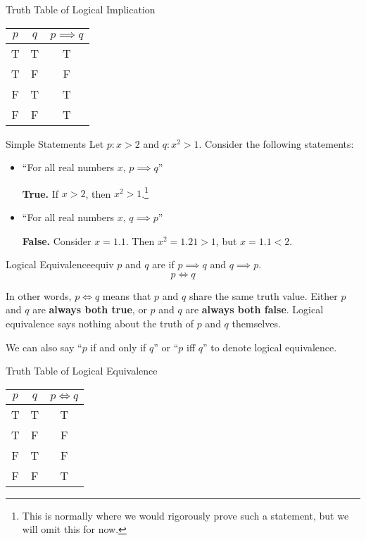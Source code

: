 \documentclass[12pt]{report}
\begin{document}
\begin{exbox}{Truth Table of Logical Implication}{}
    \begin{center}\begin{tabular}{c | c || c}
        $p$ & $q$ & $p \implies q$ \\ \hline
        T & T & T \\
        T & F & F \\
        F & T & T \\
        F & F & T
    \end{tabular}\end{center}
\end{exbox}

\begin{exbox}{Simple Statements}{}
    Let $p : x > 2$ and $q : x^2 > 1$. Consider the following statements:
    \begin{itemize}
        \item ``For all real numbers $x$, $p \implies q$''

        \textbf{True.} If $x > 2$, then $x^2 > 1$.\footnote{This is normally where we would rigorously prove such a statement, but we will omit this for now.}

        \item ``For all real numbers $x$, $q \implies p$''

        \textbf{False.} Consider $x = 1.1$. Then $x^2 = 1.21 > 1$, but $x = 1.1 < 2$.
    \end{itemize}
\end{exbox}

\begin{dfnbox}{Logical Equivalence}{equiv}
    $p$ and $q$ are  if $p \implies q$ and $q \implies p$.
    \tcblower
    \[ p \iff q \]
\end{dfnbox}

In other words, $p \iff q$ means that $p$ and $q$ share the same truth value. Either $p$ and $q$ are \textbf{always both true}, or $p$ and $q$ are \textbf{always both false}. Logical equivalence says nothing about the truth of $p$ and $q$ themselves.

We can also say ``$p$ if and only if $q$'' or ``$p$ iff $q$'' to denote logical equivalence.

\begin{exbox}{Truth Table of Logical Equivalence}{}
    \begin{center}\begin{tabular}{c | c || c}
        $p$ & $q$ & $p \iff q$ \\ \hline
        T & T & T \\
        T & F & F \\
        F & T & F \\
        F & F & T
    \end{tabular}\end{center}
\end{exbox}
\end{document}
